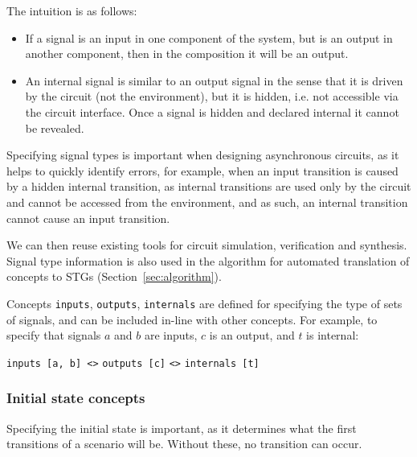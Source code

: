 \documentclass[british,conference,compsoc]{IEEEtran}
\begin{document}
The intuition is as follows:

\vspace{-2mm}
\begin{itemize}
    \item If a signal is an input in one component of the system, but is an
    output in another component, then in the composition it will be an output.
    \item An internal signal is similar to an output signal in the sense
    that it is driven by the circuit (not the environment), but it is hidden, 
    i.e. not accessible via the circuit interface. Once a signal is hidden and 
    declared internal it cannot be revealed.
\end{itemize}

\noindent Specifying signal types is important when designing asynchronous
circuits, as it helps to quickly identify errors, for example, when an input transition is
caused by a hidden internal transition, as internal transitions are used only by the circuit 
and cannot be accessed from the environment, and as such, an internal transition cannot
cause an input transition. 

We can then reuse existing tools for circuit
simulation, verification and synthesis. Signal type information is also used
in the algorithm for automated translation of concepts to
STGs (Section~\ref{sec:algorithm}).

Concepts \texttt{inputs}, \texttt{outputs}, \texttt{internals} are defined for
specifying the type of sets of signals, and can be included in-line
with other concepts. For example, to specify that signals $a$ and $b$ are 
inputs, $c$ is an output, and $t$ is internal:

\vspace{-2mm}

\begin{center}
\texttt{inputs [a, b] <>} \texttt{outputs [c]} \texttt{<>} \texttt{internals [t]}
\end{center}

\vspace{-5mm}

\subsubsection{Initial state concepts\label{sub:initState}}

Specifying the initial state is important, as it determines what the first 
transitions of a scenario will be. Without these, no transition can occur.
\end{document}
